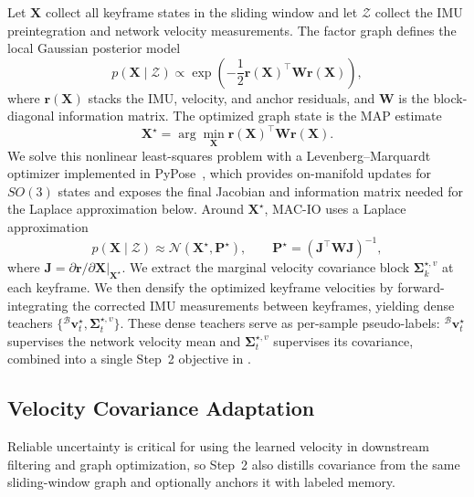 Let $\mathbf{X}$ collect all keyframe states in the sliding window and let $\mathcal{Z}$ collect the IMU preintegration and network velocity measurements.
The factor graph defines the local Gaussian posterior model
\begin{equation}
p(\mathbf{X}\mid\mathcal{Z})
\propto
\exp\left(
-\frac{1}{2}
\mathbf{r}(\mathbf{X})^\top
\mathbf{W}
\mathbf{r}(\mathbf{X})
\right),
\end{equation}
where $\mathbf{r}(\mathbf{X})$ stacks the IMU, velocity, and anchor residuals, and $\mathbf{W}$ is the block-diagonal information matrix.
The optimized graph state is the MAP estimate
\begin{equation}
\mathbf{X}^{\star}
=
\arg\min_{\mathbf{X}}
\mathbf{r}(\mathbf{X})^\top
\mathbf{W}
\mathbf{r}(\mathbf{X}).
\end{equation}
We solve this nonlinear least-squares problem with a Levenberg--Marquardt optimizer implemented in PyPose~\cite{wang2023pypose}, which provides on-manifold updates for $SO(3)$ states and exposes the final Jacobian and information matrix needed for the Laplace approximation below.
Around $\mathbf{X}^{\star}$, MAC-IO uses a Laplace approximation
\begin{equation}
p(\mathbf{X}\mid\mathcal{Z})
\approx
\mathcal{N}(\mathbf{X}^{\star},\mathbf{P}^{\star}),
\qquad
\mathbf{P}^{\star}=(\mathbf{J}^{\top}\mathbf{W}\mathbf{J})^{-1},
\end{equation}
where $\mathbf{J}=\partial\mathbf{r}/\partial\mathbf{X}|_{\mathbf{X}^{\star}}$.
We extract the marginal velocity covariance block $\boldsymbol{\Sigma}^{\star,v}_k$ at each keyframe.
We then densify the optimized keyframe velocities by forward-integrating the corrected IMU measurements between keyframes, yielding dense teachers $\{{}^\mathcal{B}\mathbf{v}^{\star}_t,\boldsymbol{\Sigma}^{\star,v}_t\}$.
These dense teachers serve as per-sample pseudo-labels: ${}^\mathcal{B}\mathbf{v}^{\star}_t$ supervises the network velocity mean and $\boldsymbol{\Sigma}^{\star,v}_t$ supervises its covariance, combined into a single Step~2 objective in .

\subsection{Velocity Covariance Adaptation}
\label{sec:macio:kl}

Reliable uncertainty is critical for using the learned velocity in downstream filtering and graph optimization, so Step~2 also distills covariance from the same sliding-window graph and optionally anchors it with labeled memory.

